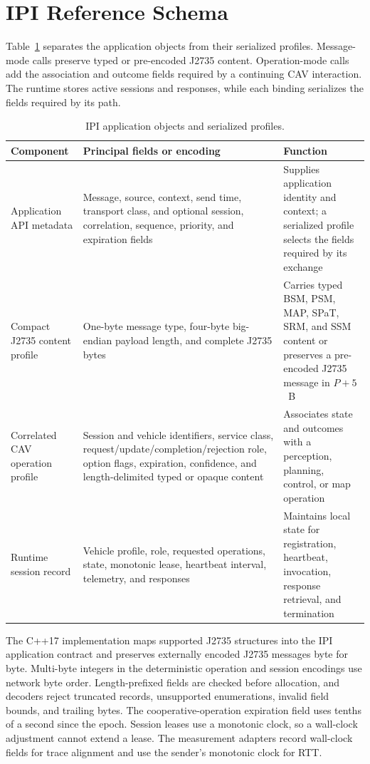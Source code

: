 \section{IPI Reference Schema}
\label{app:ipi}

Table~\ref{tab:ipi-schema} separates the application objects from their
serialized profiles. Message-mode calls preserve typed or pre-encoded J2735
content. Operation-mode calls add the association and outcome fields required
by a continuing CAV interaction. The runtime stores active sessions and
responses, while each binding serializes the fields required by its path.

\begin{table}[t]
  \caption{IPI application objects and serialized profiles.}
  \label{tab:ipi-schema}
  \centering
  \footnotesize
  \setlength{\tabcolsep}{3pt}
  \begin{tabular}{@{}p{}p{}p{}@{}}
    \toprule
    Component & Principal fields or encoding & Function \\
    \midrule
    Application API metadata & Message, source, context, send time, transport class, and optional session, correlation, sequence, priority, and expiration fields & Supplies application identity and context; a serialized profile selects the fields required by its exchange \\
    Compact J2735 content profile & One-byte message type, four-byte big-endian payload length, and complete J2735 bytes & Carries typed BSM, PSM, MAP, SPaT, SRM, and SSM content or preserves a pre-encoded J2735 message in $P+5$~B \\
    Correlated CAV operation profile & Session and vehicle identifiers, service class, request/update/completion/rejection role, option flags, expiration, confidence, and length-delimited typed or opaque content & Associates state and outcomes with a perception, planning, control, or map operation \\
    Runtime session record & Vehicle profile, role, requested operations, state, monotonic lease, heartbeat interval, telemetry, and responses & Maintains local state for registration, heartbeat, invocation, response retrieval, and termination \\
    \bottomrule
  \end{tabular}
\end{table}

The C++17 implementation maps supported J2735 structures into the IPI
application contract and preserves externally encoded J2735 messages byte for
byte. Multi-byte integers in the deterministic operation and session encodings
use network byte order. Length-prefixed fields are checked before allocation,
and decoders reject truncated records, unsupported enumerations, invalid field
bounds, and trailing bytes. The cooperative-operation expiration field uses
tenths of a second since the epoch. Session leases use a monotonic clock, so a
wall-clock adjustment cannot extend a lease. The measurement adapters record
wall-clock fields for trace alignment and use the sender's monotonic clock for
RTT.

